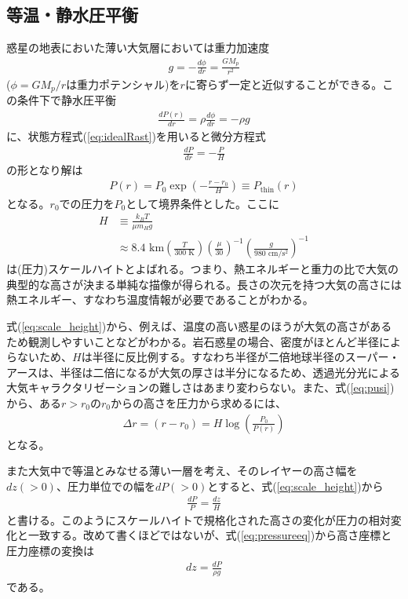 \subsection*{等温・静水圧平衡 \label{ss:atmscal}}

惑星の地表においた薄い大気層においては重力加速度
\begin{eqnarray}
g = - \frac{d \phi}{d r} = \frac{G M_p}{r^2}
\end{eqnarray}
($\phi=G M_p/r$は重力ポテンシャル)を$r$に寄らず一定と近似することができる。この条件下で静水圧平衡
\begin{eqnarray}
\label{eq:pressureeq}
\frac{d P(r)}{d r}  = \rho \frac{d \phi}{d r} =  - \rho g 
\end{eqnarray}
に、状態方程式(\ref{eq:idealRast})を用いると微分方程式
\begin{eqnarray}
\frac{d P}{d r} = - \frac{P}{H} 
\end{eqnarray}
の形となり解は
\begin{eqnarray}
\label{eq:pusi}
P(r) = P_0 \exp{\left( -\frac{r-r_0}{H} \right) } \equiv P_\mathrm{thin} (r)
\end{eqnarray}
となる。$r_0$での圧力を$P_0$として境界条件とした。ここに
\begin{align}
  \label{eq:scale_height}
H &\equiv \frac{k_B T}{\mu m_H g} \\
&\approx 8.4 \,\, \mathrm{km} \left( \frac{T}{300 \,\, \mathrm{K}} \right)  \left( \frac{\mu}{30} \right)^{-1} \left( \frac{g}{980 \,\, \mathrm{cm/s^2}} \right)^{-1}
\end{align}
は(圧力)スケールハイトとよばれる。つまり、熱エネルギーと重力の比で大気の典型的な高さが決まる単純な描像が得られる。長さの次元を持つ大気の高さには熱エネルギー、すなわち温度情報が必要であることがわかる。

式(\ref{eq:scale_height})から、例えば、温度の高い惑星のほうが大気の高さがあるため観測しやすいことなどがわかる。岩石惑星の場合、密度がほとんど半径によらないため、$H$は半径に反比例する。すなわち半径が二倍地球半径のスーパー・アースは、半径は二倍になるが大気の厚さは半分になるため、透過光分光による大気キャラクタリゼーションの難しさはあまり変わらない。また、式(\ref{eq:pusi})から、ある$r > r_0$の$r_0$からの高さを圧力から求めるには、
\begin{eqnarray}
\Delta r = (r - r_0) = H \log{\left(\frac{P_0}{P(r)}\right)}  
\end{eqnarray}
となる。

また大気中で等温とみなせる薄い一層を考え、そのレイヤーの高さ幅を$d z (> 0)$、圧力単位での幅を$d P (>0)$とすると、式(\ref{eq:scale_height})から
\begin{eqnarray}
\label{eq:conversion_z_P}
\frac{d P}{P} = \frac{d z}{H} 
\end{eqnarray}
と書ける。このようにスケールハイトで規格化された高さの変化が圧力の相対変化と一致する。改めて書くほどではないが、式(\ref{eq:pressureeq})から高さ座標と圧力座標の変換は
\begin{eqnarray}
\label{eq:pressureeq_}
d z = \frac{d P}{\rho g}
\end{eqnarray}
である。

